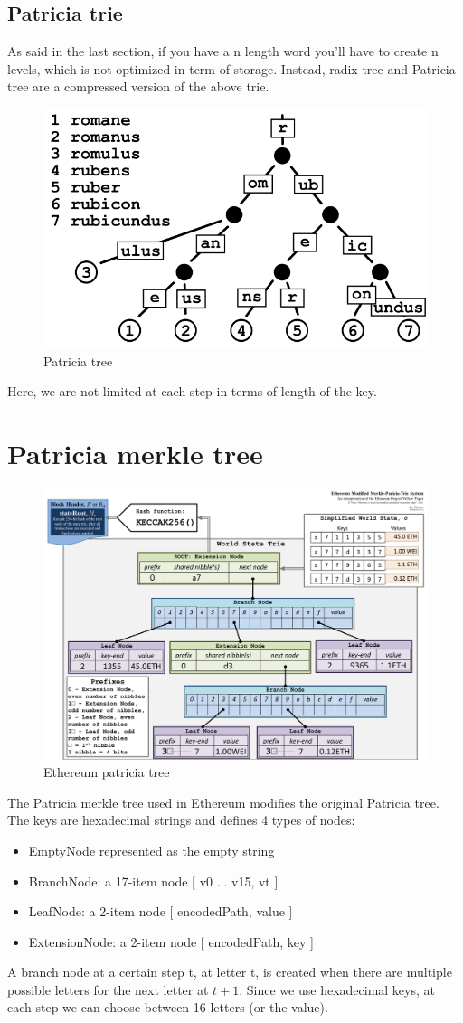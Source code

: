 \subsection{Patricia trie}
As said in the last section, if you have a n length word you'll have to create n levels, which is not optimized in term of storage. 
Instead, radix tree and Patricia tree are a compressed version of the above trie.
\begin{figure}[H]
    \centering
\includegraphics[width=0.4\linewidth]{background/patricia.png}
    \caption{Patricia tree}
    \label{fig:patricia}
\end{figure}
Here, we are not limited at each step in terms of length of the key.

\section{Patricia merkle tree}

\begin{figure}[H]
    \centering
\includegraphics[width=0.9\linewidth]{background/ethereum_mpt.png}
    \caption{Ethereum patricia tree}
    \label{fig:eth_mpt}
\end{figure}

The Patricia merkle tree used in Ethereum modifies the original Patricia tree. The keys are hexadecimal strings and defines 4 types of nodes: 
\begin{itemize}
    \item EmptyNode represented as the empty string
    \item BranchNode: a 17-item node [ v0 ... v15, vt ]
    \item LeafNode: a 2-item node [ encodedPath, value ]
    \item ExtensionNode: a 2-item node [ encodedPath, key ]
\end{itemize}
A branch node at a certain step t, at letter t, is created when there are multiple possible letters for the next letter at $t+1$. Since we use hexadecimal keys, at each step we can choose between 16 letters (or the value).

